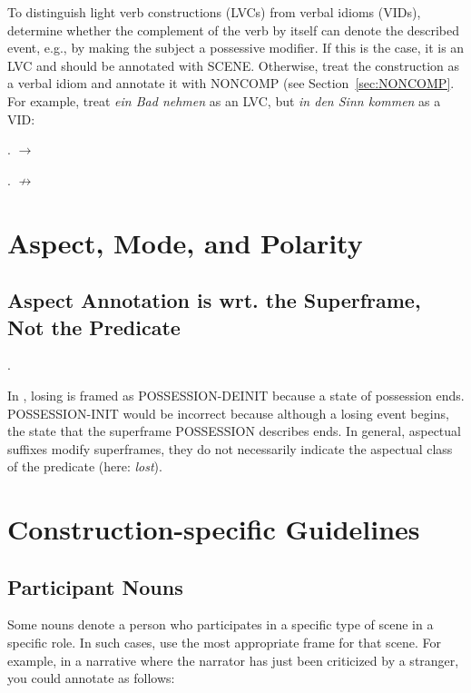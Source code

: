 \documentclass[a4paper]{article}
\newcommand{\fr}[1]{\textsf{#1}}
\begin{document}
To distinguish light verb constructions (LVCs) from verbal idioms (VIDs),
determine whether the complement of the verb by itself can denote the described
event, e.g., by making the subject a possessive modifier. If this is the case,
it is an LVC and should be annotated with \fr{SCENE}. Otherwise, treat the
construction as a verbal idiom and annotate it with \fr{NONCOMP} (see
Section~\ref{sec:NONCOMP}. For example, treat \emph{ein Bad nehmen} as an LVC,
but \emph{in den Sinn kommen} as a VID:

\ex. $\rightarrow$ 

\ex. $\nrightarrow$ 


\newpage\section{Aspect, Mode, and Polarity}

\subsection{Aspect Annotation is wrt. the Superframe, Not the Predicate}

\ex.

In \Last, losing is framed as \fr{POSSESSION-DEINIT} because a state of
possession ends. \fr{POSSESSION-INIT} would be incorrect because although a
losing event begins, the state that the superframe \fr{POSSESSION} describes
ends. In general, aspectual suffixes modify superframes, they do not
necessarily indicate the aspectual class of the predicate (here: \emph{lost}).


\newpage\section{Construction-specific Guidelines}

\subsection{Participant Nouns}

Some nouns denote a person who participates in a specific type of scene in a
specific role. In such cases, use the most appropriate frame for that scene.
For example, in a narrative where the narrator has just been criticized by a
stranger, you could annotate as follows:
\end{document}
